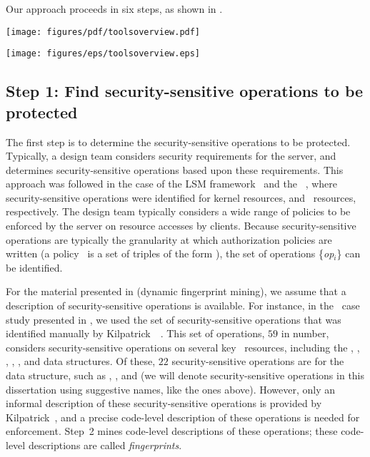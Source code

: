 Our approach proceeds in six steps, as shown in .

\begin{figure*}[tb!]
\ifpdf
\centerline{\texttt{[image: figures/pdf/toolsoverview.pdf]}}
\else
\centerline{\texttt{[image: figures/eps/toolsoverview.eps]}}
\fi
{}
{\label{figure:toolsoverview}}
\end{figure*}


\subsection{Step 1: Find security-sensitive operations to be protected}
\label{chapter:overview:approach:step1}
%
The first step is to determine the security-sensitive operations to be
protected. Typically, a design team considers security requirements for the
server, and determines security-sensitive operations based upon these
requirements. This approach was followed in the case of the LSM
framework~\cite{wcs+02} and the \xserver~\cite{ksv03}, where security-sensitive
operations were identified for kernel resources, and \xserver\ resources,
respectively. The design team typically considers a wide range of policies to
be enforced by the server on resource accesses by clients. Because
security-sensitive operations are typically the granularity at which
authorization policies are written (a policy \policy\ is a set of triples of
the form ), the set
of operations \{\textit{op}$_i$\} can be identified.

For the material presented in  (dynamic fingerprint
mining), we assume that a description of security-sensitive operations is
available. For instance, in the \xserver\ case study presented in
, we used the set of security-sensitive operations
that was identified manually by Kilpatrick~\etal~\cite{ksv03}.  This set of
operations, $59$ in number, considers security-sensitive operations on several
key \xserver\ resources, including the , ,
, , , and  data structures.
Of these, $22$ security-sensitive operations are for the  data
structure, such as , , and
 (we will denote security-sensitive operations in this
dissertation using suggestive names, like the ones above). However, only an
informal description of these security-sensitive operations is provided by
Kilpatrick~\etal, and a precise code-level description of these operations is
needed for enforcement.  Step~2 mines code-level descriptions of these
operations; these code-level descriptions are called \textit{fingerprints}. 

